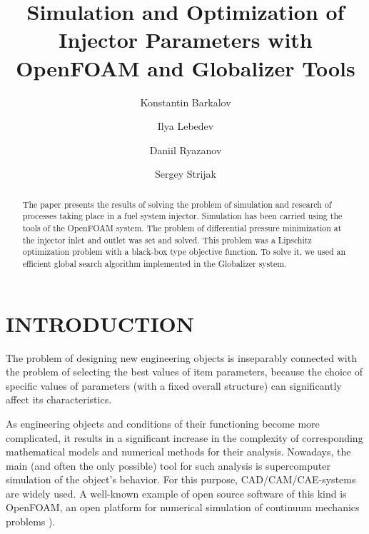 \documentclass{aip-cp}
\begin{document}
\title{Simulation and Optimization of Injector Parameters with OpenFOAM and Globalizer Tools}

\author[aff1]{Konstantin Barkalov}
\author[aff1]{Ilya Lebedev}
\author[aff2]{Daniil Ryazanov}
\author[aff2]{Sergey Strijak}


\maketitle

\begin{abstract}
The paper presents the results of solving the problem of simulation and research of processes taking place in a fuel system injector. Simulation has been carried using the tools of the OpenFOAM system. The problem of differential pressure minimization at the injector inlet and outlet was set and solved. This problem was a Lipschitz optimization problem with a black-box type objective function. To solve it, we used an efficient global search algorithm implemented in the Globalizer system.
\end{abstract}

\section{INTRODUCTION}

The problem of designing new engineering objects is inseparably connected with the problem of selecting the best values of item parameters, because the choice of specific values of parameters (with a fixed overall structure) can significantly affect its characteristics.

As engineering objects and conditions of their functioning become more complicated, it results in a significant increase in the complexity of corresponding mathematical models and numerical methods for their analysis. Nowadays, the main (and often the only possible) tool for such analysis is supercomputer simulation of the object's behavior. For this purpose, CAD/CAM/CAE-systems are widely used. A well-known example of open source software of this kind is OpenFOAM, an open platform for numerical simulation of continuum mechanics problems \cite{OpenFOAM}).
\end{document}
